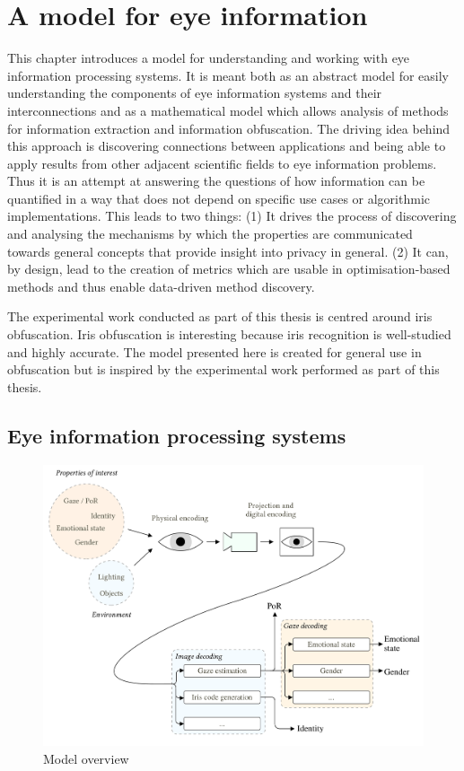 \chapter{A model for eye information}
This chapter introduces a model for understanding and working with eye information processing systems. It is meant both as an abstract model for easily understanding the components of eye information systems and their interconnections and as a mathematical model which allows analysis of methods for information extraction and information obfuscation. The driving idea behind this approach is discovering connections between applications and being able to apply results from other adjacent scientific fields to eye information problems. Thus it is an attempt at answering the questions of how information can be quantified in a way that does not depend on specific use cases or algorithmic implementations. This leads to two things: (1) It drives the process of discovering and analysing the mechanisms by which the properties are communicated towards general concepts that provide insight into privacy in general. (2) It can, by design, lead to the creation of metrics which are usable in optimisation-based methods and thus enable data-driven method discovery.

The experimental work conducted as part of this thesis is centred around iris obfuscation. Iris obfuscation is interesting because iris recognition is well-studied and highly accurate. The model presented here is created for general use in obfuscation but is inspired by the experimental work performed as part of this thesis.

\section{Eye information processing systems}
\begin{figure}
	\centering
	\includegraphics[width=1\textwidth]{figures/model/eye-tracking-model}
	\caption{Model overview}\label{fig:eye-tracking-model}
\end{figure}



